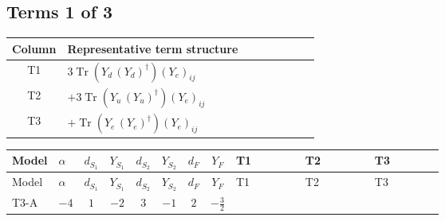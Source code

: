 \documentclass[8pt]{article}
\begin{document}
\begin{landscape}
\subsection*{Terms 1 of 3}
\begin{center}
\begin{tabular}{@{}c >{\raggedright\arraybackslash}p{0.82\linewidth}@{}}
\toprule
Column & Representative term structure \\
\midrule
T1 & \(\displaystyle 3 \operatorname{Tr}\!\left({Y_d}\,\left({Y_d}\right)^{\dagger}\right) \left({Y_e}\right)_{ij}\) \\
\midrule
T2 & \(\displaystyle +3 \operatorname{Tr}\!\left({Y_u}\,\left({Y_u}\right)^{\dagger}\right) \left({Y_e}\right)_{ij}\) \\
\midrule
T3 & \(\displaystyle +\operatorname{Tr}\!\left({Y_e}\,\left({Y_e}\right)^{\dagger}\right) \left({Y_e}\right)_{ij}\) \\
\midrule
\bottomrule
\end{tabular}
\end{center}
\smallskip
\tiny
\begin{longtable}{@{}llcccccc >{\raggedright\arraybackslash}p{0.21\linewidth} >{\raggedright\arraybackslash}p{0.21\linewidth} >{\raggedright\arraybackslash}p{0.21\linewidth}@{}}
\toprule
Model & $\alpha$ & $d_{S_1}$ & $Y_{S_1}$ & $d_{S_2}$ & $Y_{S_2}$ & $d_F$ & $Y_F$ & T1 & T2 & T3 \\
\midrule
\endfirsthead
\toprule
Model & $\alpha$ & $d_{S_1}$ & $Y_{S_1}$ & $d_{S_2}$ & $Y_{S_2}$ & $d_F$ & $Y_F$ & T1 & T2 & T3 \\
\midrule
\endhead
T3-A & $-4$ & $1$ & $-2$ & $3$ & $-1$ & $2$ & $-\frac{3}{2}$ & \scriptsize\adjustbox{max width=\linewidth}{$\begin{gathered} 3 \operatorname{Tr}\!\left({Y_d}\,\left({Y_d}\right)^{\dagger}\right) \left({Y_e}\right)_{ij}\end{gathered}$} & \scriptsize\adjustbox{max width=\linewidth}{$\begin{gathered} +3 \operatorname{Tr}\!\left({Y_u}\,\left({Y_u}\right)^{\dagger}\right) \left({Y_e}\right)_{ij}\end{gathered}$} & \scriptsize\adjustbox{max width=\linewidth}{$\begin{gathered} +\operatorname{Tr}\!\left({Y_e}\,\left({Y_e}\right)^{\dagger}\right) \left({Y_e}\right)_{ij}\end{gathered}$} \\
\midrule

\end{longtable}
\end{landscape}
\end{document}
